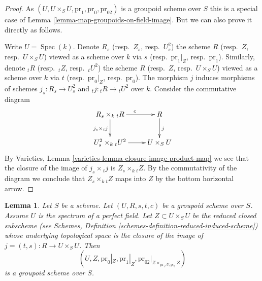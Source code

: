\documentclass{stacks-project}
\theoremstyle{plain}
\newtheorem{lemma}[subsection]{Lemma}
\theoremstyle{definition}
\theoremstyle{remark}
\numberwithin{equation}{subsection}
\def\Spec{\mathop{\mathrm{Spec}}}
\begin{document}
\begin{proof}
As $(U, U \times_S U, \text{pr}_1, \text{pr}_0, \text{pr}_{02})$
is a groupoid scheme over $S$ this is a special case of
Lemma \ref{lemma-map-groupoids-on-field-image}.
But we can also prove it directly as follows.

\medskip\noindent
Write $U = \Spec(k)$. Denote
$R_s$ (resp.\ $Z_s$, resp.\ $U^2_s$) the scheme
$R$ (resp.\ $Z$, resp.\ $U \times_S U$) viewed as a scheme over $k$ via
$s$ (resp.\ $\text{pr}_1|_Z$, resp.\ $\text{pr}_1$).
Similarly, denote
${}_tR$ (resp.\ ${}_tZ$, resp.\ ${}_tU^2$) the scheme
$R$ (resp.\ $Z$, resp.\ $U \times_S U$) viewed as a scheme over $k$ via
$t$ (resp.\ $\text{pr}_0|_Z$, resp.\ $\text{pr}_0$).
The morphism $j$ induces morphisms of schemes
$j_s : R_s \to U^2_s$ and ${}_tj : {}_tR \to {}_tU^2$ over $k$.
Consider the commutative diagram
$$
\xymatrix{
R_s \times_k {}_tR \ar[r]^c \ar[d]_{j_s \times {}_tj} &  R \ar[d]^j \\
U^2_s \times_k {}_tU^2 \ar[r] & U \times_S U
}
$$
By
Varieties, Lemma \ref{varieties-lemma-closure-image-product-map}
we see that the closure of the image of $j_s \times {}_tj$ is
$Z_s \times_k {}_tZ$. By the commutativity of the diagram we
conclude that $Z_s \times_k {}_tZ$ maps into $Z$ by the bottom
horizontal arrow.
\end{proof}

\begin{lemma}
\label{lemma-groupoid-on-perfect-field-image}
Let $S$ be a scheme. Let $(U, R, s, t, c)$ be a groupoid scheme
over $S$. Assume $U$ is the spectrum of a perfect field.
Let $Z \subset U \times_S U$ be the reduced closed subscheme (see
Schemes, Definition \ref{schemes-definition-reduced-induced-scheme})
whose underlying topological space is the closure of the image of
$j = (t, s) : R \to U \times_S U$.
Then
$$
(U, Z, \text{pr}_0|_Z, \text{pr}_1|_Z,
\text{pr}_{02}|_{Z \times_{\text{pr}_1, U, \text{pr}_0} Z})
$$
is a groupoid scheme over $S$.
\end{lemma}
\end{document}
